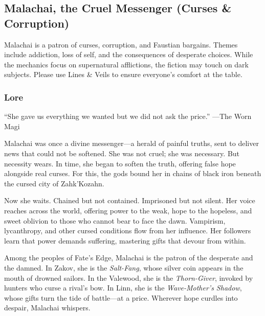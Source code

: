 
\subsection{Malachai, the Cruel Messenger (Curses \& Corruption)}

\begin{tcolorbox}[colback=black!5,colframe=red!70!black,title=\textbf{Content Warning},breakable]
Malachai is a patron of curses, corruption, and Faustian bargains. Themes include addiction, loss of self, and the consequences of desperate choices. While the mechanics focus on supernatural afflictions, the fiction may touch on dark subjects. Please use Lines \& Veils to ensure everyone's comfort at the table.
\end{tcolorbox}

\subsubsection*{Lore}
``She gave us everything we wanted but we did not ask the price.'' ---The Worn Magi

Malachai was once a divine messenger---a herald of painful truths, sent to deliver news that could not be softened. She was not cruel; she was necessary. But necessity wears. In time, she began to soften the truth, offering false hope alongside real curses. For this, the gods bound her in chains of black iron beneath the cursed city of Zahk'Kozahn.

Now she waits. Chained but not contained. Imprisoned but not silent. Her voice reaches across the world, offering power to the weak, hope to the hopeless, and sweet oblivion to those who cannot bear to face the dawn. Vampirism, lycanthropy, and other cursed conditions flow from her influence. Her followers learn that power demands suffering, mastering gifts that devour from within.

Among the peoples of Fate's Edge, Malachai is the patron of the desperate and the damned. In Zakov, she is the \textit{Salt-Fang}, whose silver coin appears in the mouth of drowned sailors. In the Valewood, she is the \textit{Thorn-Giver}, invoked by hunters who curse a rival's bow. In Linn, she is the \textit{Wave-Mother's Shadow}, whose gifts turn the tide of battle---at a price. Wherever hope curdles into despair, Malachai whispers.

